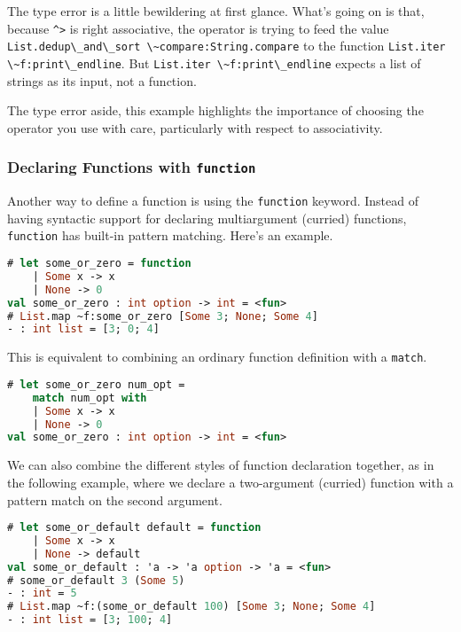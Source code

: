 The type error is a little bewildering at first glance. What's going on
is that, because \passthrough{\lstinline!^>!} is right associative, the
operator is trying to feed the value
\passthrough{\lstinline!List.dedup\_and\_sort \~compare:String.compare!}
to the function \passthrough{\lstinline!List.iter \~f:print\_endline!}.
But \passthrough{\lstinline!List.iter \~f:print\_endline!} expects a
list of strings as its input, not a function.

The type error aside, this example highlights the importance of choosing
the operator you use with care, particularly with respect to
associativity.~

\hypertarget{declaring-functions-with-function}{%
\subsubsection{\texorpdfstring{Declaring Functions with
\texttt{function}}{Declaring Functions with function}}\label{declaring-functions-with-function}}

Another way to define a function is using the
\passthrough{\lstinline!function!} keyword. Instead of having syntactic
support for declaring multiargument (curried) functions,
\passthrough{\lstinline!function!} has built-in pattern matching. Here's
an example.

\begin{lstlisting}[language=Caml]
# let some_or_zero = function
    | Some x -> x
    | None -> 0
val some_or_zero : int option -> int = <fun>
# List.map ~f:some_or_zero [Some 3; None; Some 4]
- : int list = [3; 0; 4]
\end{lstlisting}

This is equivalent to combining an ordinary function definition with a
\passthrough{\lstinline!match!}.

\begin{lstlisting}[language=Caml]
# let some_or_zero num_opt =
    match num_opt with
    | Some x -> x
    | None -> 0
val some_or_zero : int option -> int = <fun>
\end{lstlisting}

We can also combine the different styles of function declaration
together, as in the following example, where we declare a two-argument
(curried) function with a pattern match on the second argument.

\begin{lstlisting}[language=Caml]
# let some_or_default default = function
    | Some x -> x
    | None -> default
val some_or_default : 'a -> 'a option -> 'a = <fun>
# some_or_default 3 (Some 5)
- : int = 5
# List.map ~f:(some_or_default 100) [Some 3; None; Some 4]
- : int list = [3; 100; 4]
\end{lstlisting}

